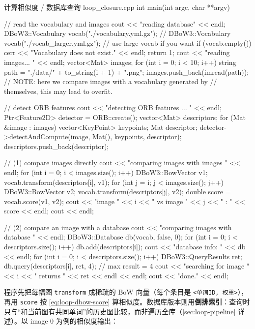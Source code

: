 \begin{codebox}[C++]{计算相似度 / 数据库查询 loop\_closure.cpp}
int main(int argc, char **argv) {
    // read the vocabulary and images
    cout << "reading database" << endl;
    DBoW3::Vocabulary vocab("./vocabulary.yml.gz");
    // DBoW3::Vocabulary vocab("./vocab_larger.yml.gz"); // use large vocab if you want
    if (vocab.empty()) {
        cerr << "Vocabulary does not exist." << endl;
        return 1;
    }
    cout << "reading images... " << endl;
    vector<Mat> images;
    for (int i = 0; i < 10; i++) {
        string path = "./data/" + to_string(i + 1) + ".png";
        images.push_back(imread(path));
    }
    // NOTE: here we compare images with a vocabulary generated by
    // themselves, this may lead to overfit.

    // detect ORB features
    cout << "detecting ORB features ... " << endl;
    Ptr<Feature2D> detector = ORB::create();
    vector<Mat> descriptors;
    for (Mat &image : images) {
        vector<KeyPoint> keypoints;
        Mat descriptor;
        detector->detectAndCompute(image, Mat(), keypoints, descriptor);
        descriptors.push_back(descriptor);
    }

    // (1) compare images directly
    cout << "comparing images with images " << endl;
    for (int i = 0; i < images.size(); i++) {
        DBoW3::BowVector v1;
        vocab.transform(descriptors[i], v1);
        for (int j = i; j < images.size(); j++) {
            DBoW3::BowVector v2;
            vocab.transform(descriptors[j], v2);
            double score = vocab.score(v1, v2);
            cout << "image " << i << " vs image " << j << " : " << score << endl;
        }
        cout << endl;
    }

    // (2) compare an image with a database
    cout << "comparing images with database " << endl;
    DBoW3::Database db(vocab, false, 0);
    for (int i = 0; i < descriptors.size(); i++)
        db.add(descriptors[i]);
    cout << "database info: " << db << endl;
    for (int i = 0; i < descriptors.size(); i++) {
        DBoW3::QueryResults ret;
        db.query(descriptors[i], ret, 4); // max result = 4
        cout << "searching for image " << i << " returns " << ret << endl << endl;
    }
    cout << "done." << endl;
}
\end{codebox}

\noindent 程序先把每幅图 \verb|transform| 成稀疏的 BoW 向量（每个条目是 \verb|<单词ID, 权重>|），再用 \verb|score| 按 \cref{eq:loop-dbow-score} 算相似度。数据库版本则用\textbf{倒排索引}：查询时只与“和当前图有共同单词”的历史图比较，而非遍历全库（\cref{sec:loop-pipeline} 详述）。以 image 0 为例的相似度输出：

